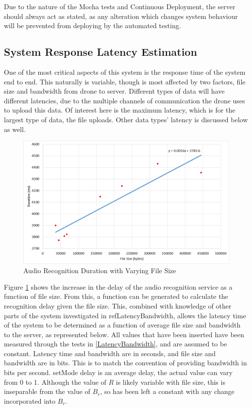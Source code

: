 \documentclass{article}
\begin{document}
Due to the nature of the Mocha tests and Continuous Deployment, the server should always act as stated, as any alteration which changes system behaviour will be prevented from deploying by the automated testing.



\subsection{System Response Latency Estimation}
One of the most critical aspects of this system is the response time of the system end to end. This naturally is variable, though is most affected by two factors, file size and bandwidth from drone to server. Different types of data will have different latencies, due to the multiple channels of communication the drone uses to upload this data. Of interest here is the maximum latency, which is for the largest type of data, the file uploads. Other data types' latency is discussed below as well.

\begin{figure}[h]
\caption{Audio Recognition Duration with Varying File Size\label{fig:RecognitionDuration}}
\includegraphics[width=\textwidth]{RecognitionDuration}
\end{figure}

Figure \ref{fig:RecognitionDuration} shows the increase in the delay of the audio recognition service as a function of file size. From this, a function can be generated to calculate the recognition delay given the file size. This, combined with knowledge of other parts of the system investigated in ref{LatencyBandwidth}, allows the latency time of the system to be determined as a function of average file size and bandwidth to the server, as represented below. All values that have been inserted have been measured through the tests in \ref{LatencyBandwidth}, and are assumed to be constant. Latency time and bandwidth are in seconds, and file size and bandwidth are in bits. This is to match the convention of providing bandwidth in bits per second. setMode delay is an average delay, the actual value can vary from 0 to 1. Although the value of $R$ is likely variable with file size, this is inseparable from the value of $B_r$, so has been left a constant with any change incorporated into $B_r$.
\end{document}
